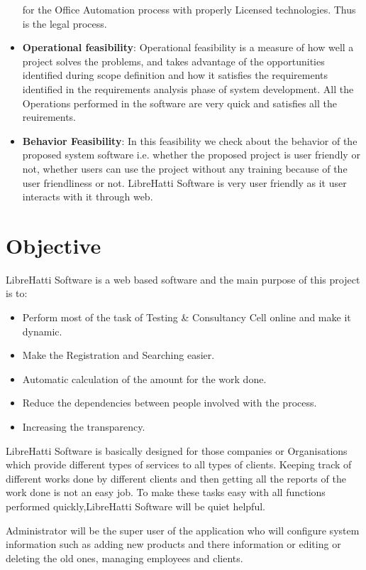 \begin{itemize}
for the Office Automation process with properly Licensed technologies. 
Thus is the legal process.
\item {\bf{Operational feasibility}}: Operational feasibility is a measure 
of how well a project solves the problems, and takes advantage of the 
opportunities identified during scope definition and how it satisfies 
the requirements identified in the requirements analysis phase of system 
development. All the Operations performed in the software are very quick 
and satisfies all the reuirements.
\item {\bf{Behavior Feasibility}}: In this feasibility we check about the 
behavior of the proposed system software i.e. whether the proposed 
project is user friendly or not, whether users can use the project 
without any training because of the user friendliness or not. LibreHatti Software is very user friendly as it user interacts with it 
through web.
\end{itemize}
\section{Objective}
LibreHatti Software is a web based software and the 
main purpose of this project is to:
\begin{itemize}
\item Perform most of the task of Testing \& Consultancy Cell online 
and make it dynamic.
\item Make the Registration and Searching easier.
\item Automatic calculation of the amount for the work done.
\item Reduce the dependencies between people involved with the process.
\item Increasing the transparency.
\end{itemize}
LibreHatti Software is basically 
designed for those companies or Organisations which provide different 
types of services to all types of clients. Keeping track of different 
works done by different clients and then getting all the reports of 
the work done is not an easy job. To make these tasks easy with all 
functions performed quickly,LibreHatti Software will be quiet helpful.

Administrator will be the super user of the application who will 
configure system information such as adding new products and there 
information or editing or deleting the old ones, managing employees 
and clients.
